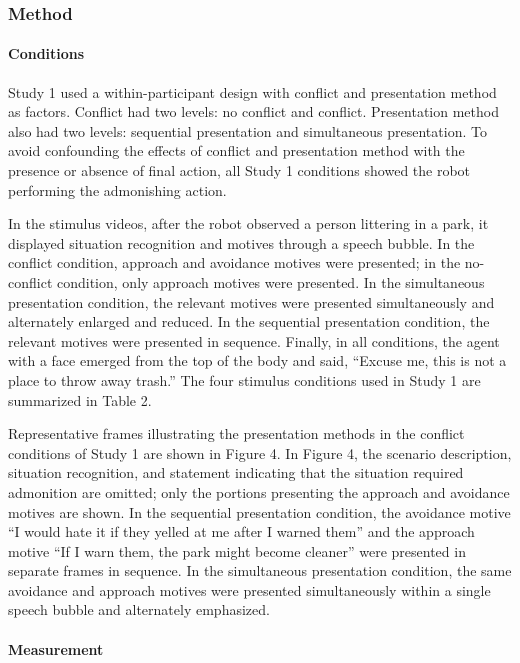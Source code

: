 \documentclass[
]{article}
\begin{document}
\subsubsection{Method}\label{method}

\paragraph{Conditions}\label{conditions}

Study 1 used a within-participant design with conflict and presentation
method as factors. Conflict had two levels: no conflict and conflict.
Presentation method also had two levels: sequential presentation and
simultaneous presentation. To avoid confounding the effects of conflict
and presentation method with the presence or absence of final action,
all Study 1 conditions showed the robot performing the admonishing
action.

In the stimulus videos, after the robot observed a person littering in a
park, it displayed situation recognition and motives through a speech
bubble. In the conflict condition, approach and avoidance motives were
presented; in the no-conflict condition, only approach motives were
presented. In the simultaneous presentation condition, the relevant
motives were presented simultaneously and alternately enlarged and
reduced. In the sequential presentation condition, the relevant motives
were presented in sequence. Finally, in all conditions, the agent with a
face emerged from the top of the body and said, ``Excuse me, this is not
a place to throw away trash.'' The four stimulus conditions used in
Study 1 are summarized in Table 2.

Representative frames illustrating the presentation methods in the
conflict conditions of Study 1 are shown in Figure 4. In Figure 4, the
scenario description, situation recognition, and statement indicating
that the situation required admonition are omitted; only the portions
presenting the approach and avoidance motives are shown. In the
sequential presentation condition, the avoidance motive ``I would hate
it if they yelled at me after I warned them'' and the approach motive
``If I warn them, the park might become cleaner'' were presented in
separate frames in sequence. In the simultaneous presentation condition,
the same avoidance and approach motives were presented simultaneously
within a single speech bubble and alternately emphasized.

\paragraph{Measurement}\label{measurement}
\end{document}
